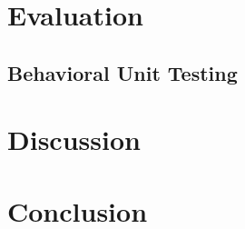\documentclass[sigconf,authordraft]{acmart}
\begin{document}
\section{Evaluation}
\label{sec:evaluation}

\subsection{Behavioral Unit Testing}

\section{Discussion}
\label{sec:discussion}

\section{Conclusion}
\label{sec:conclusion}



\end{document}

